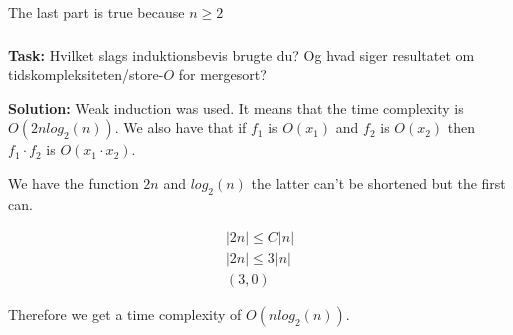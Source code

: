 \noindent
The last part is true because $n\geq2$

\subsubsection{}
\textbf{Task:} Hvilket slags induktionsbevis brugte du? Og hvad siger resultatet om tidskompleksiteten/store-$O$ for mergesort?

\bigskip
\noindent
\textbf{Solution:} Weak induction was used. It means that the time complexity is $O(2nlog_2(n))$. We also have that if $f_1$ is $O(x_1)$ and $f_2$ is $O(x_2)$ then $f_1\cdot f_2$ is $O(x_1\cdot x_2)$.

We have the function $2n$ and $log_2(n)$ the latter can't be shortened but the first can. 

\begin{equation}
    \begin{aligned}
        |2n|\leq C|n|\\
        |2n|\leq 3|n|\\
        (3, 0)
    \end{aligned}
\end{equation}

\noindent
Therefore we get a time complexity of $O(nlog_2(n))$.
